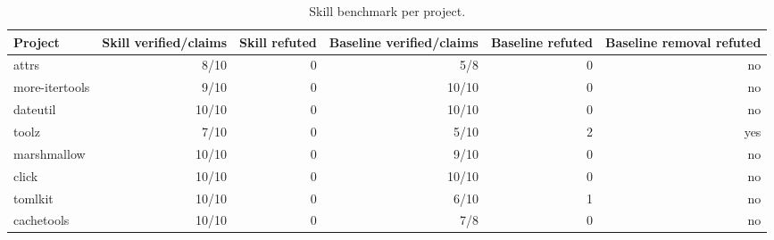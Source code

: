 \begin{table}[t]
\centering\small
\begin{tabular}{lrrrrr}
\toprule
Project & Skill verified/claims & Skill refuted & Baseline verified/claims & Baseline refuted & Baseline removal refuted \\
\midrule
attrs & 8/10 & 0 & 5/8 & 0 & no \\
more-itertools & 9/10 & 0 & 10/10 & 0 & no \\
dateutil & 10/10 & 0 & 10/10 & 0 & no \\
toolz & 7/10 & 0 & 5/10 & 2 & yes \\
marshmallow & 10/10 & 0 & 9/10 & 0 & no \\
click & 10/10 & 0 & 10/10 & 0 & no \\
tomlkit & 10/10 & 0 & 6/10 & 1 & no \\
cachetools & 10/10 & 0 & 7/8 & 0 & no \\
\bottomrule
\end{tabular}
\caption{Skill benchmark per project.}
\label{tab:benchprojects}
\end{table}

